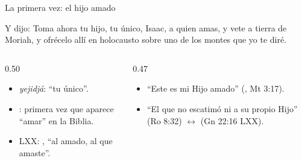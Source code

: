 \begin{frame}{La primera vez: el hijo amado}
\begin{center}\end{center}
\begin{cita}Y dijo: Toma ahora tu hijo, tu único, Isaac, a quien amas, y vete a tierra de Moriah, y ofrécelo allí en holocausto sobre uno de los montes que yo te diré.\end{cita}
\begin{columns}[t,onlytextwidth]
\begin{column}{0.50\textwidth}\scriptsize
\begin{itemize}
\item {} \emph{yejidjá}: ``tu único''.
\item {}: primera vez que aparece ``amar'' en la Biblia.
\item LXX: , ``al amado, al que amaste''.
\end{itemize}
\end{column}
\begin{column}{0.47\textwidth}\scriptsize
\begin{itemize}
\item ``Este es mi Hijo amado'' (, Mt 3:17).
\item ``El que no escatimó ni a su propio Hijo'' (Ro 8:32) $\leftrightarrow$  (Gn 22:16 LXX).
\end{itemize}
\end{column}
\end{columns}
\end{frame}

